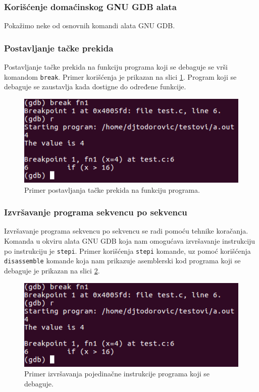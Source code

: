 \documentclass[12pt,oneside]{memoir}
\begin{document}
\subsubsection{Korišćenje domaćinskog GNU GDB alata}

Pokažimo neke od osnovnih komandi alata GNU GDB.

\subsubsection{Postavljanje tačke prekida}

Postavljanje tačke prekida na funkciju programa koji se debaguje se vrši komandom \texttt{break}. Primer korišćenja je prikazan na slici \ref{fig:break-fn}. Program koji se debaguje se zaustavlja kada dostigne do određene funkcije.

\begin{figure}[h!]
	\begin{center}
		\includegraphics[scale=0.5]{slike/break-fn.png}
	\end{center}
	\caption{Primer postavljanja tačke prekida na funkciju programa.}
	\label{fig:break-fn}
\end{figure}

\subsubsection{Izvršavanje programa sekvencu po sekvencu}

Izvršavanje programa sekvencu po sekvencu se radi pomoću tehnike koračanja. Komanda u okviru alata GNU GDB koja nam omogućava izvršavanje instrukciju po instrukciju je \texttt{stepi}. Primer korišćenja \texttt{stepi} komande, uz pomoć korišćenja \texttt{disassemble} komande koja nam prikazuje asemblerski kod programa koji se debaguje je prikazan na slici \ref{fig:stepi}.

\begin{figure}[h!]
	\begin{center}
		\includegraphics[scale=0.5]{slike/break-fn.png}
	\end{center}
	\caption{Primer izvršavanja pojedinačne instrukcije programa koji se debaguje.}
	\label{fig:stepi}
\end{figure}
\end{document}
